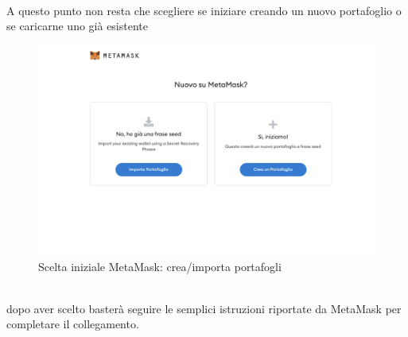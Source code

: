\textbf{}\\
A questo punto non resta che scegliere se iniziare creando un nuovo portafoglio o se caricarne uno già esistente 

\begin{figure}[H]
    \centering
    \includegraphics[scale=0.3]{immagini/MetaMask/chooseMetamask.png}
    \caption{Scelta iniziale MetaMask: crea/importa portafogli}
\end{figure}

\textbf{}\\
dopo aver scelto basterà seguire le semplici istruzioni riportate da MetaMask per completare il collegamento.

